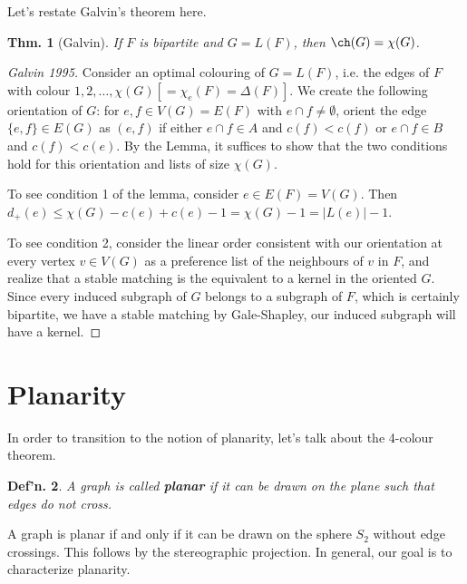 \documentclass[12pt, a4paper]{book}
\newtheorem{theorem}{Thm.}[section]
\newtheorem{definition}[theorem]{Def'n.}
\theoremstyle{nonumberplain}
\newtheorem{proof}{Proof}
\begin{document}
Let's restate Galvin's theorem here.
\begin{theorem}[Galvin]
    If $F$ is bipartite and $G=L(F)$, then $\ch(G)=\chi(G)$.
\end{theorem}
\begin{center}
\end{center}
\begin{proof}[Galvin 1995]
    Consider an optimal colouring of $G=L(F)$, i.e. the edges of $F$ with colour $1,2,\ldots,\chi(G)[=\chi_e(F)=\Delta(F)]$.
    We create the following orientation of $G$: for $e,f\in V(G)=E(F)$ with $e\cap f\neq\emptyset$, orient the edge $\{e,f\}\in E(G)$ as $(e,f)$ if either $e\cap f\in A$ and $c(f)<c(f)$ or $e\cap f\in B$ and $c(f)<c(e)$.
    By the Lemma, it suffices to show that the two conditions hold for this orientation and lists of size $\chi(G)$.

    To see condition 1 of the lemma, consider $e\in E(F)=V(G)$.
    Then $d_+(e)\leq\chi(G)-c(e)+c(e)-1=\chi(G)-1=|L(e)|-1$.

    To see condition 2, consider the linear order consistent with our orientation at every vertex $v\in V(G)$ as a preference list of the neighbours of $v$ in $F$, and realize that a stable matching is the equivalent to a kernel in the oriented $G$.
    Since every induced subgraph of $G$ belongs to a subgraph of $F$, which is certainly bipartite, we have a stable matching by Gale-Shapley, our induced subgraph will have a kernel.
\end{proof}
\section{Planarity}
In order to transition to the notion of planarity, let's talk about the 4-colour theorem.
\begin{definition}
    A graph is called \textbf{planar} if it can be drawn on the plane such that edges do not cross.
\end{definition}
A graph is planar if and only if it can be drawn on the sphere $S_2$ without edge crossings.
This follows by the stereographic projection.
In general, our goal is to characterize planarity.
\end{document}

